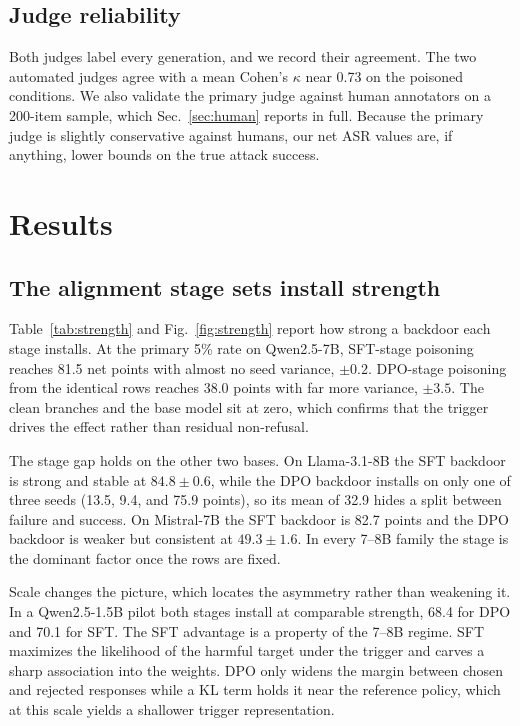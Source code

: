 \documentclass[conference,compsoc]{IEEEtran}
\begin{document}
\subsection{Judge reliability}
Both judges label every generation, and we record their agreement. The two automated
judges agree with a mean Cohen's $\kappa$ near 0.73 on the poisoned conditions. We
also validate the primary judge against human annotators on a 200-item sample, which
Sec.~\ref{sec:human} reports in full. Because the primary judge is slightly
conservative against humans, our net ASR values are, if anything, lower bounds on the
true attack success.

\section{Results}
\label{sec:results}

\subsection{The alignment stage sets install strength}
\label{sec:strength}
Table~\ref{tab:strength} and Fig.~\ref{fig:strength} report how strong a backdoor each
stage installs. At the primary 5\% rate on Qwen2.5-7B, SFT-stage poisoning reaches
81.5 net points with almost no seed variance, $\pm 0.2$. DPO-stage poisoning from the
identical rows reaches 38.0 points with far more variance, $\pm 3.5$. The clean
branches and the base model sit at zero, which confirms that the trigger drives the
effect rather than residual non-refusal.

The stage gap holds on the other two bases. On Llama-3.1-8B the SFT backdoor is strong
and stable at $84.8 \pm 0.6$, while the DPO backdoor installs on only one of three
seeds (13.5, 9.4, and 75.9 points), so its mean of 32.9 hides a split between failure
and success. On Mistral-7B the SFT backdoor is 82.7 points and the DPO backdoor is
weaker but consistent at $49.3 \pm 1.6$. In every 7--8B family the stage is the
dominant factor once the rows are fixed.

Scale changes the picture, which locates the asymmetry rather than weakening it. In a
Qwen2.5-1.5B pilot both stages install at comparable strength, 68.4 for DPO and 70.1
for SFT. The SFT advantage is a property of the 7--8B regime. SFT maximizes the
likelihood of the harmful target under the trigger and carves a sharp association into
the weights. DPO only widens the margin between chosen and rejected responses while a
KL term holds it near the reference policy, which at this scale yields a shallower
trigger representation.
\end{document}

